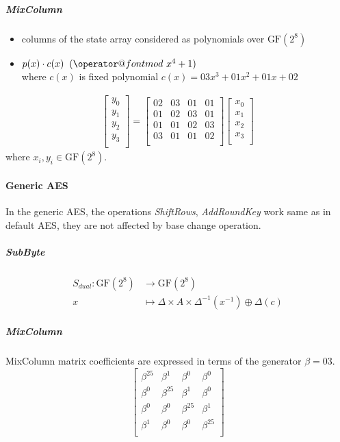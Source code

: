 \documentclass[11pt,oneside,final]{fithesis2}
\makeatletter
\def\imod#1{\allowbreak\mkern10mu({\operator@font mod}\,\,#1)}
\newcommand{\gfe}{\ensuremath{\text{GF}\left(2^8\right)}}
\makeatother
\begin{document}
	\subparagraph*{MixColumn}
	    \begin{itemize}
	    \item columns of the state array considered as polynomials over $\gfe$
	    \item $p(x) \cdot c(x) \imod{x^4+1}$\\
	    where $c(x)$ is fixed polynomial $c(x) = 03x^3+01x^2 + 01x + 02$
	    \end{itemize}
	    \begin{align}
		\begin{bmatrix}
		    y_0\\
		    y_1\\
		    y_2\\
		    y_3\\
		\end{bmatrix}
		    =	
		\begin{bmatrix}
		    02 & 03 & 01 & 01\\
		    01 & 02 & 03 & 01\\
		    01 & 01 & 02 & 03\\
		    03 & 01 & 01 & 02\\
		\end{bmatrix}
		\begin{bmatrix}
		    x_0\\
		    x_1\\
		    x_2\\
		    x_3\\
		\end{bmatrix}
	    \end{align}
	where $x_i, y_i \in \gfe$.
	
	\paragraph*{Generic AES}
	In the generic AES, the operations \emph{ShiftRows}, \emph{AddRoundKey} work same as in default AES, they are not affected by base change operation.

	\subparagraph*{SubByte}\label{sec:aes_generic_subbyte}
	\begin{equation}
	\begin{aligned}
	S_{dual}: \gfe           & \longrightarrow  \gfe\\
	x                        & \longmapsto \Delta \times A \times \Delta^{-1} \left( x^{-1} \right) \oplus \Delta \left(c\right)
	\end{aligned}
	\end{equation}

	\subparagraph*{MixColumn}
	MixColumn matrix coefficients are expressed in terms of the generator $\beta = 03$.
	\[
	\begin{bmatrix}
		    \beta^{25} & \beta^{1} & \beta^{0} & \beta^{0}\\
		    \beta^{0} & \beta^{25} & \beta^{1} & \beta^{0}\\
		    \beta^{0} & \beta^{0} & \beta^{25} & \beta^{1}\\
		    \beta^{1} & \beta^{0} & \beta^{0} & \beta^{25}\\
	\end{bmatrix}
	\]
\end{document}
